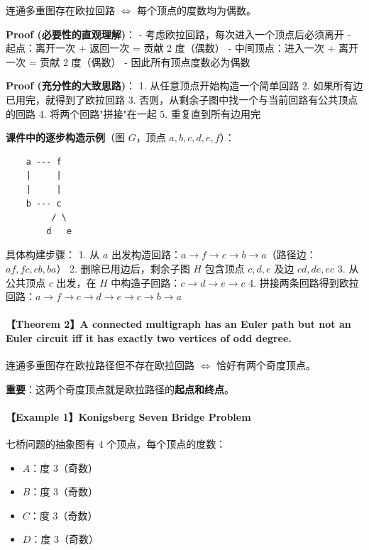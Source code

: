 \documentclass[10pt,a4paper,openany]{ctexbook}
\theoremstyle{definition}
\theoremstyle{remark}
\renewenvironment{quote}
  {\list{}{\leftmargin=1em\rightmargin=0pt\topsep=0.5pt\partopsep=0pt}\item[]}
  {\endlist}
\begin{document}
\begin{quote}
连通多重图存在欧拉回路 $\iff$ 每个顶点的度数均为偶数。

\textbf{Proof (必要性的直观理解)}：
- 考虑欧拉回路，每次进入一个顶点后必须离开
- 起点：离开一次 + 返回一次 = 贡献 2 度（偶数）
- 中间顶点：进入一次 + 离开一次 = 贡献 2 度（偶数）
- 因此所有顶点度数必为偶数

\textbf{Proof (充分性的大致思路)}：
1. 从任意顶点开始构造一个简单回路
2. 如果所有边已用完，就得到了欧拉回路
3. 否则，从剩余子图中找一个与当前回路有公共顶点的回路
4. 将两个回路"拼接"在一起
5. 重复直到所有边用完

\textbf{课件中的逐步构造示例}（图 $G$，顶点 $a,b,c,d,e,f$）：
{\footnotesize\begin{verbatim}
    a --- f
    |     |
    |     |
    b --- c
         / \
        d   e
\end{verbatim}}

具体构建步骤：
1. 从 $a$ 出发构造回路：$a \to f \to c \to b \to a$（路径边：$af, fc, cb, ba$）
2. 删除已用边后，剩余子图 $H$ 包含顶点 $c, d, e$ 及边 $cd, de, ec$
3. 从公共顶点 $c$ 出发，在 $H$ 中构造子回路：$c \to d \to e \to c$
4. 拼接两条回路得到欧拉回路：$a \to f \to c \to d \to e \to c \to b \to a$

\end{quote}

\paragraph{【Theorem 2】A connected multigraph has an \textbf{Euler path} but \textbf{not} an Euler circuit iff it has \textbf{exactly two vertices of odd degree}.}

\begin{quote}
连通多重图存在欧拉路径但不存在欧拉回路 $\iff$ 恰好有两个奇度顶点。

\textbf{重要}：这两个奇度顶点就是欧拉路径的\textbf{起点和终点}。

\end{quote}

\paragraph{【Example 1】Konigsberg Seven Bridge Problem}

七桥问题的抽象图有 4 个顶点，每个顶点的度数：
\begin{itemize}
\item $A$：度 3（奇数）
\item $B$：度 3（奇数）
\item $C$：度 3（奇数）
\item $D$：度 3（奇数）

\end{itemize}
\end{document}
